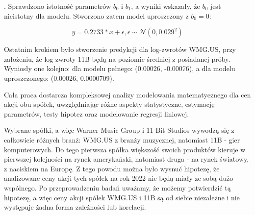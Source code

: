 \documentclass[a4paper,11pt]{article}
\begin{document}
. Sprawdzono istotność parametrów \(b_0\) i \(b_1\), a wyniki wskazały, że \(b_0\) jest nieistotny dla modelu. Stworzono zatem model uproszczony z \(b_0=0\):

\[y = 0.2733 * x + \epsilon, \epsilon \sim \mathcal{N}(0, 0.029^2 )\]

Ostatnim krokiem było stworzenie predykcji dla log-zwrotów WMG.US, przy założeniu, że log-zwroty 11B będą na poziomie średniej z posiadanej próby. Wyniosły one kolejno: dla modelu pełnego: (0.00026, -0.00076), a dla modelu uproszczonego: (0.00026, 0.0000709).

Cała praca dostarcza kompleksowej analizy modelowania matematycznego dla cen akcji obu spółek, uwzględniając różne aspekty statystyczne, estymację parametrów, testy hipotez oraz modelowanie regresji liniowej.

Wybrane spółki, a więc Warner Music Group i 11 Bit Studios wywodzą się z całkowicie różnych branż: WMG.US z branży muzycznej, natomiast 11B - gier komputerowych. Do tego pierwsza spółka większość swoich produktów kieruje w pierwszej kolejności na rynek amerykański, natomiast druga - na rynek światowy, z naciskiem na Europę. Z tego powodu można było wysnuć hipotezę, że analizowane ceny akcji tych spółek na rok 2022 nie będą miały ze sobą dużo wspólnego. Po przeprowadzeniu badań uważamy, że możemy potwierdzić tą hipotezę, a więc ceny akcji spółek WMG.US i 11B są od siebie niezależne i nie występuje żadna forma zależności lub korelacji.
\end{document}
